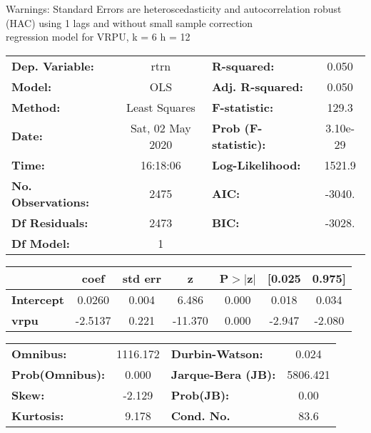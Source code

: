 Warnings: \newline
 [1] Standard Errors are heteroscedasticity and autocorrelation robust (HAC) using 1 lags and without small sample correction\\ 

regression model for VRPU, k = 6 h = 12\begin{center}
\begin{tabular}{lclc}
\toprule
\textbf{Dep. Variable:}    &       rtrn       & \textbf{  R-squared:         } &     0.050   \\
\textbf{Model:}            &       OLS        & \textbf{  Adj. R-squared:    } &     0.050   \\
\textbf{Method:}           &  Least Squares   & \textbf{  F-statistic:       } &     129.3   \\
\textbf{Date:}             & Sat, 02 May 2020 & \textbf{  Prob (F-statistic):} &  3.10e-29   \\
\textbf{Time:}             &     16:18:06     & \textbf{  Log-Likelihood:    } &    1521.9   \\
\textbf{No. Observations:} &        2475      & \textbf{  AIC:               } &    -3040.   \\
\textbf{Df Residuals:}     &        2473      & \textbf{  BIC:               } &    -3028.   \\
\textbf{Df Model:}         &           1      & \textbf{                     } &             \\
\bottomrule
\end{tabular}
\begin{tabular}{lcccccc}
                   & \textbf{coef} & \textbf{std err} & \textbf{z} & \textbf{P$> |$z$|$} & \textbf{[0.025} & \textbf{0.975]}  \\
\midrule
\textbf{Intercept} &       0.0260  &        0.004     &     6.486  &         0.000        &        0.018    &        0.034     \\
\textbf{vrpu}      &      -2.5137  &        0.221     &   -11.370  &         0.000        &       -2.947    &       -2.080     \\
\bottomrule
\end{tabular}
\begin{tabular}{lclc}
\textbf{Omnibus:}       & 1116.172 & \textbf{  Durbin-Watson:     } &    0.024  \\
\textbf{Prob(Omnibus):} &   0.000  & \textbf{  Jarque-Bera (JB):  } & 5806.421  \\
\textbf{Skew:}          &  -2.129  & \textbf{  Prob(JB):          } &     0.00  \\
\textbf{Kurtosis:}      &   9.178  & \textbf{  Cond. No.          } &     83.6  \\
\bottomrule
\end{tabular}
\end{center}


